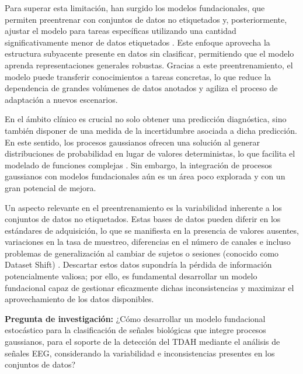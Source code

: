 Para superar esta limitación, han surgido los modelos fundacionales, que permiten preentrenar con conjuntos de datos no etiquetados y, posteriormente, ajustar el modelo para tareas específicas utilizando una cantidad significativamente menor de datos etiquetados \cite{Mathew2024,Abbaspourazad2023}. Este enfoque aprovecha la estructura subyacente presente en datos sin clasificar, permitiendo que el modelo aprenda representaciones generales robustas. Gracias a este preentrenamiento, el modelo puede transferir conocimientos a tareas concretas, lo que reduce la dependencia de grandes volúmenes de datos anotados y agiliza el proceso de adaptación a nuevos escenarios. 

En el ámbito clínico es crucial no solo obtener una predicción diagnóstica, sino también disponer de una medida de la incertidumbre asociada a dicha predicción. En este sentido, los procesos gaussianos ofrecen una solución al generar distribuciones de probabilidad en lugar de valores deterministas, lo que facilita el modelado de funciones complejas \cite{GUTIERREZBECKER2018246,Jahani2024}. Sin embargo, la integración de procesos gaussianos con modelos fundacionales aún es un área poco explorada y con un gran potencial de mejora.

Un aspecto relevante en el preentrenamiento es la variabilidad inherente a los conjuntos de datos no etiquetados. Estas bases de datos pueden diferir en los estándares de adquisición, lo que se manifiesta en la presencia de valores ausentes, variaciones en la tasa de muestreo, diferencias en el número de canales e incluso problemas de generalización al cambiar de sujetos o sesiones (conocido como Dataset Shift) \cite{APICELLA2024128354}. Descartar estos datos supondría la pérdida de información potencialmente valiosa; por ello, es fundamental desarrollar un modelo fundacional capaz de gestionar eficazmente dichas inconsistencias y maximizar el aprovechamiento de los datos disponibles.

\textbf{Pregunta de investigación:}  
¿Cómo desarrollar un modelo fundacional estocástico para la clasificación de señales biológicas que integre procesos gaussianos, para el soporte de la detección del TDAH mediante el análisis de señales EEG, considerando la variabilidad e inconsistencias presentes en los conjuntos de datos?
